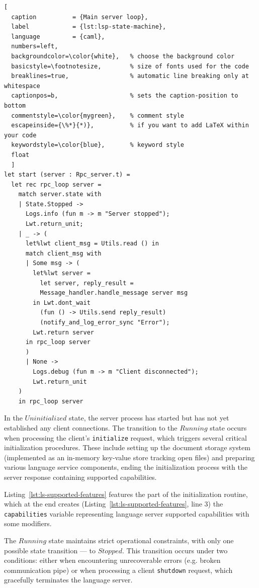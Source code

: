 \begin{lstlisting}[
  caption          = {Main server loop}, 
  label            = {lst:lsp-state-machine},
  language         = {caml},
  numbers=left,
  backgroundcolor=\color{white},   % choose the background color
  basicstyle=\footnotesize,        % size of fonts used for the code
  breaklines=true,                 % automatic line breaking only at whitespace
  captionpos=b,                    % sets the caption-position to bottom
  commentstyle=\color{mygreen},    % comment style
  escapeinside={\%*}{*)},          % if you want to add LaTeX within your code
  keywordstyle=\color{blue},       % keyword style
  float
  ]
let start (server : Rpc_server.t) =
  let rec rpc_loop server =
    match server.state with
    | State.Stopped -> 
      Logs.info (fun m -> m "Server stopped");
      Lwt.return_unit;
    | _ -> (
      let%lwt client_msg = Utils.read () in
      match client_msg with
      | Some msg -> (
        let%lwt server = 
          let server, reply_result = 
          Message_handler.handle_message server msg
        in Lwt.dont_wait
          (fun () -> Utils.send reply_result)
          (notify_and_log_error_sync "Error");
        Lwt.return server
      in rpc_loop server
      )
      | None -> 
        Logs.debug (fun m -> m "Client disconnected");
        Lwt.return_unit
    )
    in rpc_loop server
\end{lstlisting}

In the $Uninitialized$ state, the server process has started but has not yet
established any client connections.  The transition to the $Running$ state
occurs when processing the client's \texttt{initialize} request, which triggers
several critical initialization procedures. These include setting up the
document storage system (implemented as an in-memory key-value store tracking
open files) and preparing various language service components, ending the
initialization process with the server response containing supported
capabilities.

Listing~\ref{lst:ls-supported-features} features the part of the initialization 
routine, which at the end creates (Listing~\ref{lst:ls-supported-features}, line
3) the \texttt{capabilities} variable representing language server supported
capabilities with some modifiers.

The $Running$ state maintains strict operational constraints, with only one
possible state transition --- to $Stopped$. This transition occurs under two
conditions: either when encountering unrecoverable errors (e.g. broken
communication pipe) or when processing a client \texttt{shutdown} request, which
gracefully terminates the language server.

